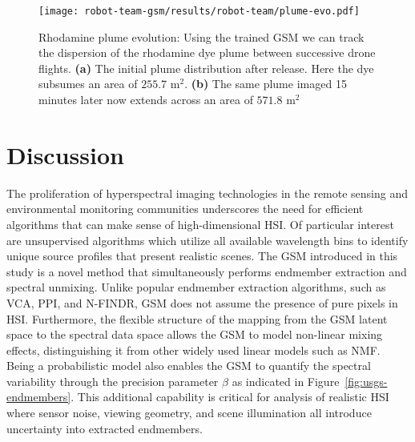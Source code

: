 \begin{sidewaysfigure}
  \centering
  \texttt{[image: robot-team-gsm/results/robot-team/plume-evo.pdf]}
  \caption{Rhodamine plume evolution: Using the trained GSM we can track the
    dispersion of the rhodamine dye plume between successive drone flights.
    \textbf{(a)} The initial plume distribution after release. Here the dye
    subsumes an area of $255.7$ $\text{m}^2$. \textbf{(b)} The same plume imaged
    15 minutes later now extends across an area of $571.8$ $\text{m}^2$}
  \label{fig:plume-evo}
\end{sidewaysfigure}





\clearpage
\newpage

\section{Discussion}


The proliferation of hyperspectral imaging technologies in the remote sensing
and environmental monitoring communities underscores the need for efficient
algorithms that can make sense of high-dimensional HSI. Of particular interest
are unsupervised algorithms which utilize all available wavelength bins to
identify unique source profiles that present realistic scenes. The GSM
introduced in this study is a novel method that simultaneously performs
endmember extraction and spectral unmixing. Unlike popular endmember extraction
algorithms, such as VCA, PPI, and N-FINDR, GSM does not assume the presence of
pure pixels in HSI. Furthermore, the flexible structure of the mapping from the
GSM latent space to the spectral data space allows the GSM to model non-linear
mixing effects, distinguishing it from other widely used linear models such as
NMF. Being a probabilistic model also enables the GSM to quantify the spectral
variability through the precision parameter $\beta$ as indicated in
Figure~\ref{fig:usgs-endmembers}. This additional capability is critical for
analysis of realistic HSI where sensor noise, viewing geometry, and scene
illumination all introduce uncertainty into extracted endmembers.


